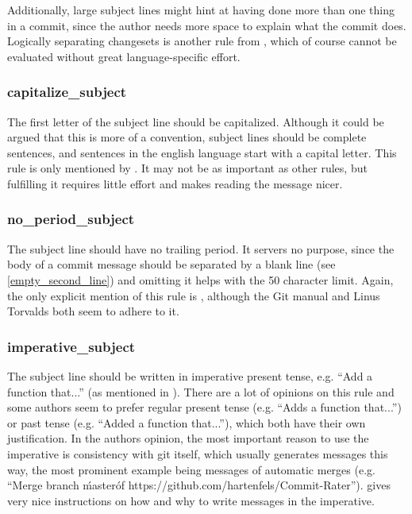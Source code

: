 Additionally, large subject lines might hint at having done more than one thing in a commit, since the author needs more space to explain what the commit does. Logically separating changesets is another rule from \cite{OffGuide}, which of course cannot be evaluated without great language-specific effort.

\subsubsection{capitalize\_subject}
\label{subs:capitalize_subject}
The first letter of the subject line should be capitalized. Although it could be argued that this is more of a convention, subject lines should be complete sentences, and sentences in the english language start with a capital letter. This rule is only mentioned by \cite{CB}. It may not be as important as other rules, but fulfilling it requires little effort and makes reading the message nicer.

\subsubsection{no\_period\_subject}
\label{subs:no_period_subject}
The subject line should have no trailing period. It servers no purpose, since the body of a commit message should be separated by a blank line (see \ref{empty_second_line}) and omitting it helps with the 50 character limit. Again, the only explicit mention of this rule is \cite{CB}, although the Git manual \cite{OffGuide} and Linus Torvalds \cite{SR} both seem to adhere to it.

\subsubsection{imperative\_subject}
\label{subs:imperative_subject}
The subject line should be written in imperative present tense, e.g. ``Add a function that...'' (as mentioned in \cite{OffGuide}). There are a lot of opinions on this rule and some authors seem to prefer regular present tense (e.g. ``Adds a function that...'') or past tense (e.g. ``Added a function that...''), which both have their own justification. In the authors opinion, the most important reason to use the imperative is consistency with git itself, which usually generates messages this way, the most prominent example being messages of automatic merges (e.g. ``Merge branch \'master\' of https://github.com/hartenfels/Commit-Rater''). \cite{CB} gives very nice instructions on how and why to write messages in the imperative.

